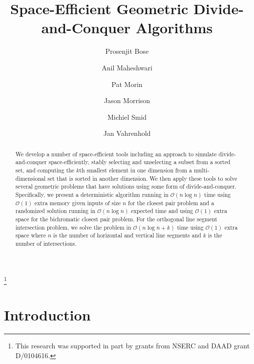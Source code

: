 \documentclass{elsart}
\newcommand{\Oh}[1]{\ensuremath{\mathcal{O}(#1)}}
\begin{document}
\begin{frontmatter}
\title{Space-Efficient Geometric Divide-and-Conquer
Algorithms}
\thanks[funding]{This research was supported in part by grants from
NSERC and DAAD grant D/0104616.}
\author[carleton]{Prosenjit Bose}
\author[carleton]{Anil Maheshwari}
\author[carleton]{Pat Morin}
\author[carleton]{Jason Morrison}
\author[carleton]{Michiel Smid}
\author[muenster]{Jan Vahrenhold}
\address[carleton]{School of Computer Science, Carleton University, 
         1125 Colonel By Drive, \\ Ottawa, Ontario, Canada, K1S~5B6}
\address[muenster]{Westf\"{a}lische Wilhelms-Universit\"{a}t,
    Institut f\"{u}r Informatik, 48149 M\"{u}nster, Germany} 

\begin{abstract}
  We develop a number of space-efficient tools including an approach
  to simulate divide-and-conquer space-efficiently, stably selecting
  and unselecting a subset from a sorted set, and computing the $k$th
  smallest element in one dimension from a multi-dimensional set that
  is sorted in another dimension.  We then apply these tools to solve
  several geometric problems that have solutions using some form of
  divide-and-conquer. Specifically, we present a deterministic
  algorithm running in $\Oh{n \log n}$ time using $\Oh{1}$ extra
  memory given inputs of size $n$ for the closest pair problem and a
  randomized solution running in $\Oh{n \log n}$ expected time and
  using $\Oh{1}$ extra space for the bichromatic closest pair problem.
  For the orthogonal line segment intersection problem, we solve the
  problem in $\Oh{n\log n + k}$ time using $\Oh{1}$ extra space where
  $n$ is the number of horizontal and vertical line segments and $k$
  is the number of intersections.
\end{abstract}
\end{frontmatter}

\section{Introduction}
\end{document}
